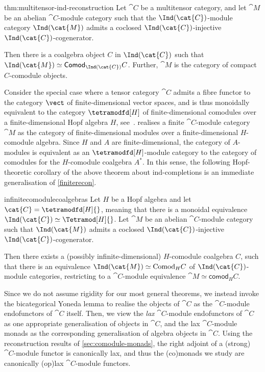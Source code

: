 \begin{reptheorem}{thm:multitensor-ind-reconstruction}
  Let \(\cat{C}\) be a multitensor category,
  and let \(\cat{M}\) be an abelian \(\cat{C}\)\hyp{}module category
  such that the \(\Ind(\cat{C})\)\hyp{}module category \(\Ind(\cat{M})\)
  admits a coclosed \(\Ind(\cat{C})\)\hyp{}injective \(\Ind(\cat{C})\)\hyp{}cogenerator.

  Then there is a coalgebra object \(C\) in \(\Ind(\cat{C})\)
  such that \(\Ind(\cat{M}) \simeq \mathsf{Comod}_{\Ind(\cat{C})}C\).
  Further, \(\cat{M}\) is the category of compact \(C\)\hyp{}comodule objects.
\end{reptheorem}

Consider the special case where a tensor category \(\cat{C}\) admits a fibre functor
to the category \(\vect\) of finite-dimensional vector spaces,
and is thus monoidally equivalent to the category \(\tetramodfd[H]\) of finite-dimensional comodules
over a finite-dimensional Hopf algebra \(H\), see~\cite{ulbrich1990:HopfAlgebrasRigid}.
 realises a finite \(\cat{C}\)\hyp{}module category \(\cat{M}\) as
the category of finite-dimensional modules over a finite-dimensional \(H\)\hyp{}comodule algebra.
Since \(H\) and \(A\) are finite-dimensional,
the category of \(A\)\hyp{}modules is equivalent
as an \(\tetramodfd[H]\)\hyp{}module category
to the category of comodules for the \(H\)\hyp{}comodule coalgebra \(A^{\ast}\).
In this sense, the following Hopf-theoretic corollary of the above theorem about ind-completions is an immediate generalisation of \cref{finiterecon}.

\begin{reptheorem}{infinitecomodulecoalgebras}
  Let \(H\) be a Hopf algebra and let \(\cat{C} = \tetramodfd[H]{}\),
  meaning that there is a monoidal equivalence \(\Ind(\cat{C}) \simeq \Tetramod[H]{}\).
  Let \(\cat{M}\) be an abelian \(\cat{C}\)\hyp{}module category
  such that \(\Ind(\cat{M})\)
  admits a coclosed \(\Ind(\cat{C})\)\hyp{}injective \(\Ind(\cat{C})\)\hyp{}cogenerator.

  Then there exists a (possibly infinite-dimensional) \(H\)\hyp{}comodule coalgebra \(C\),
  such that there is an equivalence \(\Ind(\cat{M}) \simeq \mathrm{Comod}_{H}C\)
  of \(\Ind(\cat{C})\)\hyp{}module categories,
  restricting to a \(\cat{C}\)\hyp{}module equivalence \(\cat{M} \simeq \mathsf{comod}_{H}C\).
\end{reptheorem}

Since we do not assume rigidity for our most general theorems,
we instead invoke the bicategorical Yoneda lemma to realise the objects of \(\cat{C}\) as the \(\cat{C}\)\hyp{}module endofunctors of \(\cat{C}\) itself.
Then, we view the \emph{lax} \(\cat{C}\)\hyp{}module endofunctors of \(\cat{C}\) as one appropriate generalisation of objects in \(\cat{C}\),
and the lax \(\cat{C}\)\hyp{}module monads as the corresponding generalisation of algebra objects in \(\cat{C}\).
Using the reconstruction results of \cref{sec:comodule-monads},
the right adjoint of a (strong) \(\cat{C}\)\hyp{}module functor is canonically lax,
and thus the (co)monads we study are canonically (op)lax \(\cat{C}\)\hyp{}module functors.

